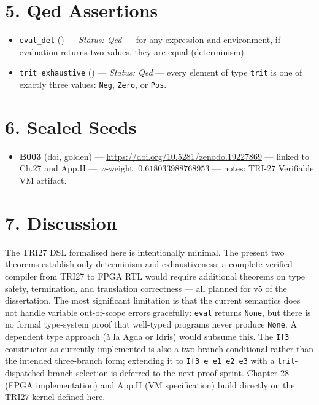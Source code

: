 \section{5. Qed
Assertions}\label{fa_27:qed-assertions}

\begin{itemize}
\tightlist
\item
  \texttt{eval\_det}
  ()
  --- \emph{Status: Qed} --- for any expression
  and environment, if evaluation returns two
  values, they are equal (determinism).
\item
  \texttt{trit\_exhaustive}
  ()
  --- \emph{Status: Qed} --- every element of type
  \texttt{trit} is one of exactly three values:
  \texttt{Neg}, \texttt{Zero}, or \texttt{Pos}.
\end{itemize}

\section{6. Sealed Seeds}\label{fa_27:sealed-seeds}

\begin{itemize}
\tightlist
\item
  \textbf{B003} (doi, golden) ---
  \url{https://doi.org/10.5281/zenodo.19227869}
  --- linked to Ch.27 and App.H ---
  \(\varphi\)-weight: \(0.618033988768953\) ---
  notes: TRI-27 Verifiable VM artifact.
\end{itemize}

\section{7. Discussion}\label{fa_27:discussion}

The TRI27 DSL formalised here is intentionally
minimal. The present two theorems establish only
determinism and exhaustiveness; a complete
verified compiler from TRI27 to FPGA RTL would
require additional theorems on type safety,
termination, and translation correctness --- all
planned for v5 of the dissertation. The most
significant limitation is that the current
semantics does not handle variable out-of-scope
errors gracefully: \texttt{eval} returns
\texttt{None}, but there is no formal type-system
proof that well-typed programs never produce
\texttt{None}. A dependent type approach (à la
Agda or Idris) would subsume this. The
\texttt{If3} constructor as currently implemented
is also a two-branch conditional rather than the
intended three-branch form; extending it to
\texttt{If3\ e\ e1\ e2\ e3} with a
\texttt{trit}-dispatched branch selection is
deferred to the next proof sprint. Chapter 28
(FPGA implementation) and App.H (VM specification)
build directly on the TRI27 kernel defined here.

